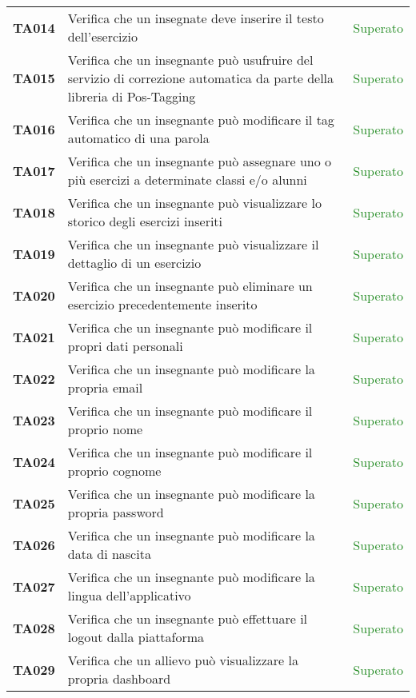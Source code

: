 \begin{tabularx}{\textwidth}{cXc}
	\textbf{TA014} & Verifica che un insegnate deve inserire il testo dell'esercizio & \textcolor{ForestGreen}{Superato} \\
	\textbf{TA015} & Verifica che un insegnante può usufruire del servizio di correzione automatica da parte della libreria di Pos-Tagging & \textcolor{ForestGreen}{Superato} \\
	\textbf{TA016} & Verifica che un insegnante può modificare il tag automatico di una parola & \textcolor{ForestGreen}{Superato} \\
	\textbf{TA017} & Verifica che un insegnante può assegnare uno o più esercizi a determinate classi e/o alunni & \textcolor{ForestGreen}{Superato} \\
	\textbf{TA018} & Verifica che un insegnante può visualizzare lo storico degli esercizi inseriti & \textcolor{ForestGreen}{Superato} \\
    \textbf{TA019} & Verifica che un insegnante può visualizzare il dettaglio di un esercizio & \textcolor{ForestGreen}{Superato} \\
	\textbf{TA020} & Verifica che un insegnante può eliminare un esercizio precedentemente inserito & \textcolor{ForestGreen}{Superato} \\
	\textbf{TA021} & Verifica che un insegnante può modificare il propri dati personali & \textcolor{ForestGreen}{Superato} \\
	\textbf{TA022} & Verifica che un insegnante può modificare la propria email & \textcolor{ForestGreen}{Superato} \\
	\textbf{TA023} & Verifica che un insegnante può modificare il proprio nome & \textcolor{ForestGreen}{Superato} \\
	\textbf{TA024} & Verifica che un insegnante può modificare il proprio cognome & \textcolor{ForestGreen}{Superato} \\
	\textbf{TA025} & Verifica che un insegnante può modificare la propria password & \textcolor{ForestGreen}{Superato} \\
	\textbf{TA026} & Verifica che un insegnante può modificare la data di nascita & \textcolor{ForestGreen}{Superato} \\
	\textbf{TA027} & Verifica che un insegnante può modificare la lingua dell'applicativo & \textcolor{ForestGreen}{Superato} \\
	\textbf{TA028} & Verifica che un insegnante può effettuare il logout dalla piattaforma & \textcolor{ForestGreen}{Superato} \\
	\textbf{TA029} & Verifica che un allievo può visualizzare la propria dashboard  & \textcolor{ForestGreen}{Superato} \\

\end{tabularx}
